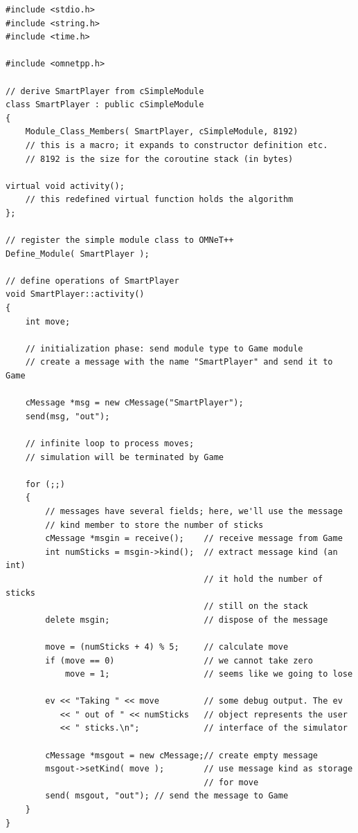 \begin{verbatim}
#include <stdio.h>
#include <string.h>
#include <time.h>

#include <omnetpp.h>

// derive SmartPlayer from cSimpleModule
class SmartPlayer : public cSimpleModule
{
    Module_Class_Members( SmartPlayer, cSimpleModule, 8192)
    // this is a macro; it expands to constructor definition etc.
    // 8192 is the size for the coroutine stack (in bytes)

virtual void activity();
    // this redefined virtual function holds the algorithm
};

// register the simple module class to OMNeT++
Define_Module( SmartPlayer );

// define operations of SmartPlayer
void SmartPlayer::activity()
{
    int move;

    // initialization phase: send module type to Game module
    // create a message with the name "SmartPlayer" and send it to Game

    cMessage *msg = new cMessage("SmartPlayer");
    send(msg, "out");

    // infinite loop to process moves;
    // simulation will be terminated by Game

    for (;;)
    {
        // messages have several fields; here, we'll use the message
        // kind member to store the number of sticks
        cMessage *msgin = receive();    // receive message from Game
        int numSticks = msgin->kind();  // extract message kind (an int)
                                        // it hold the number of sticks
                                        // still on the stack
        delete msgin;                   // dispose of the message

        move = (numSticks + 4) % 5;     // calculate move
        if (move == 0)                  // we cannot take zero
            move = 1;                   // seems like we going to lose

        ev << "Taking " << move         // some debug output. The ev
           << " out of " << numSticks   // object represents the user
           << " sticks.\n";             // interface of the simulator

        cMessage *msgout = new cMessage;// create empty message
        msgout->setKind( move );        // use message kind as storage
                                        // for move
        send( msgout, "out"); // send the message to Game
    }
}
\end{verbatim}

